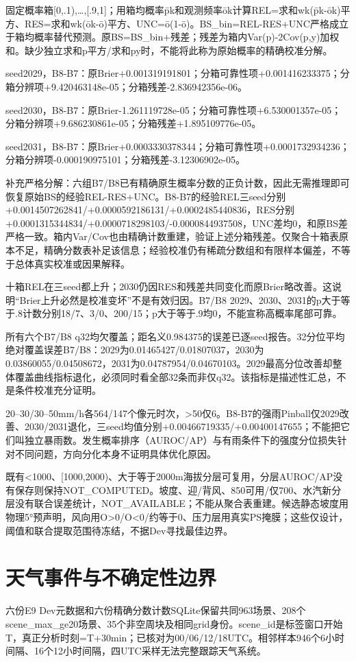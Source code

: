 \documentclass[UTF8,a4paper,10pt,fontset=none]{ctexart}
\begin{document}
固定概率箱[0,\allowbreak{}.1),\allowbreak{}…,\allowbreak{}[.9,\allowbreak{}1]；用箱均概率p̄k和观测频率ōk计算REL=求和wk(p̄k-ōk)平方、RES=求和wk(ōk-ō)平方、UNC=ō(1-ō)。BS\_bin=REL-RES+UNC严格成立于箱均概率替代预测。原BS=BS\_bin+残差；残差为箱内Var(p)-2Cov(p,\allowbreak{}y)加权和。缺少独立求和p平方/求和py时，不能将此称为原始概率的精确校准分解。

seed2029，B8-B7：原Brier+0.001319191801；分箱可靠性项+0.001416233375；分箱分辨项+9.420463148e-05；分箱残差-2.836942356e-06。

seed2030，B8-B7：原Brier-1.261119728e-05；分箱可靠性项+6.530001357e-05；分箱分辨项+9.686230861e-05；分箱残差+1.895109776e-05。

seed2031，B8-B7：原Brier+0.0003330378344；分箱可靠性项+0.0001732934236；分箱分辨项-0.000190975101；分箱残差-3.12306902e-05。

补充严格分解：六组B7/B8已有精确原生概率分数的正负计数，因此无需推理即可恢复原始BS的经验REL-RES+UNC。B8-B7的经验REL三seed分别+0.0014507262841/+0.0000592186131/+0.0002485440836，RES分别+0.0001315344834/+0.0000718298103/-0.0000844937508，UNC差均0，和原BS差严格一致。箱内Var/Cov也由精确计数重建，验证上述分箱残差。仅聚合十箱表原本不足，精确分数表补足该信息；经验校准仍有稀疏分数组和有限样本偏差，不等于总体真实校准或因果解释。

十箱REL在三seed都上升；2030仍因RES和残差共同变化而原Brier略改善。这说明“Brier上升必然是校准变坏”不是有效归因。B7/B8 2029、2030、2031的p大于等于.8计数分别18/7、3/0、200/15；p大于等于.9均0，不能宣称高概率尾部可靠。

所有六个B7/B8 q32均欠覆盖；距名义0.984375的误差已逐seed报告。32分位平均绝对覆盖误差B7/B8：2029为0.01465427/0.01807037，2030为0.03860055/0.04508672，2031为0.04787954/0.04670103。2029最高分位改善却整体覆盖曲线指标退化，必须同时看全部32条而非仅q32。该指标是描述性汇总，不是条件校准充分证明。

20–30/30–50mm/h各564/147个像元时次，>50仅6。B8-B7的强雨Pinball仅2029改善、2030/2031退化，三seed均值分别+0.00466719335/+0.00400147655；不能把它们叫独立暴雨数。发生概率排序（AUROC/AP）与有雨条件下的强度分位损失针对不同问题，方向分化本身不证明具体优化原因。

既有<1000、[1000,\allowbreak{}2000)、大于等于2000m海拔分层可复用，分层AUROC/AP没有保存则保持NOT\_COMPUTED。坡度、迎/背风、850可用/仅700、水汽新分层没有联合误差统计，NOT\_AVAILABLE；不能从聚合表重建。候选静态坡度用物理5°预声明，风向用O>0/O<0/约等于0、压力层用真实PS掩膜；这些仅设计，阈值和联合提取范围待冻结，不据Dev寻找最佳边界。
\section{天气事件与不确定性边界}
六份E9 Dev元数据和六份精确分数计数SQLite保留共同963场景、208个scene\_max\_ge20场景、35个非空周块及相同grid身份。scene\_id是标签窗口开始T，真正分析时刻=T+30min；已核对为00/06/12/18UTC。相邻样本946个6小时间隔、16个12小时间隔，四UTC采样无法完整跟踪天气系统。
\end{document}
